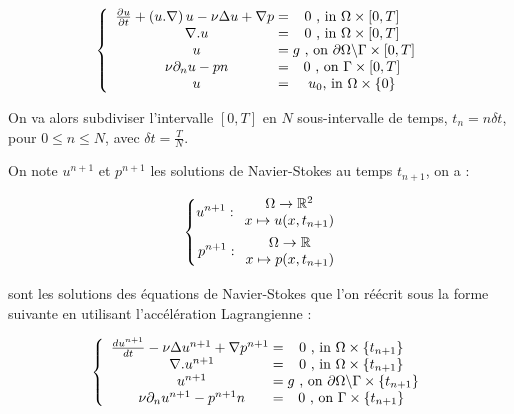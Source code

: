 \documentclass[a4paper,12pt]{article}
\begin{document}
\begin{equation}
\left \{
\begin{array}{c @{ = } c}
 \frac{\partial u}{\partial t}  + \left( u.\nabla \right) u   -\nu \Delta u + \nabla p \; & 0 \text{ , in } \Omega \times [0,T] \\
\nabla . u  & 0 \text{ , in } \Omega \times [0,T] \\
u & \; g \text{ , on } \partial\Omega \backslash \Gamma \times [0,T] \\
\nu\partial_{n}u - pn & 0 \text{ , on } \Gamma \times [0,T] \\
u & u_0 \text{, in } \Omega \times \{0\} \\
\end{array}
\right.
\end{equation}

On va alors subdiviser l'intervalle $[0,T]$ en $N$ sous-intervalle de temps, $t_n = n \delta t$, pour $0 \leq n \leq N$, avec $\delta t = \frac{T}{N}$.

On note $u^{n+1}$ et $p^{n+1}$ les solutions de Navier-Stokes au temps $t_{n+1}$, on a :

\begin{equation}
\left \{
\begin{split}
u^{n+1} :  \begin{array}{c @{} c}
\Omega \to \mathbb{R}^2 \\
x \mapsto u(x,t_{n+1})
\end{array} \\
p^{n+1} : \begin{array}{c @{} c}
\Omega \to \mathbb{R} \\
x \mapsto p(x,t_{n+1})
\end{array}
\end{split}
\right.
\end{equation}

sont les solutions des équations de Navier-Stokes que l'on réécrit sous la forme suivante en utilisant l'accélération Lagrangienne :

\begin{equation}
\left \{
\begin{array}{c @{ = } c}
 \frac{d u^{n+1}}{d t} -\nu \Delta u^{n+1} + \nabla p^{n+1} \; & 0 \text{ , in } \Omega \times \{t_{n+1}\} \\
\nabla . u^{n+1}  & 0 \text{ , in } \Omega \times \{t_{n+1}\} \\
u^{n+1} & \; g \text{ , on } \partial\Omega \backslash \Gamma \times \{t_{n+1}\} \\
\nu\partial_{n}u^{n+1} - p^{n+1} n & 0 \text{ , on } \Gamma \times \{t_{n+1}\} \\
\end{array}
\right.
\end{equation}
\end{document}
